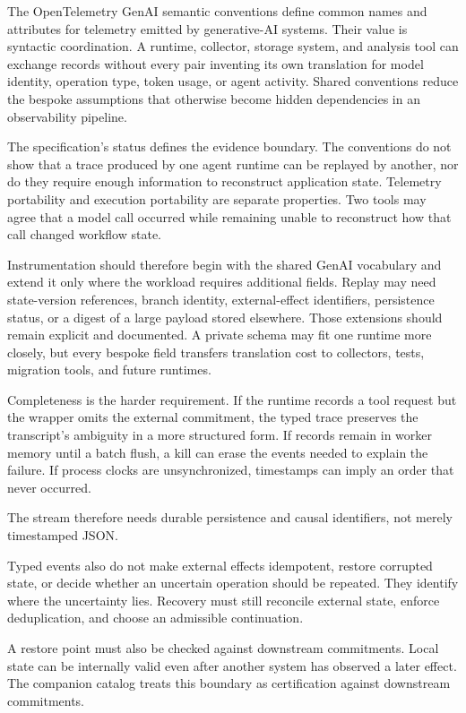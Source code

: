 The OpenTelemetry GenAI semantic conventions define common names and attributes for telemetry emitted by generative-AI systems. Their value is syntactic coordination. A runtime, collector, storage system, and analysis tool can exchange records without every pair inventing its own translation for model identity, operation type, token usage, or agent activity. Shared conventions reduce the bespoke assumptions that otherwise become hidden dependencies in an observability pipeline.

The specification's status defines the evidence boundary. The conventions do not show that a trace produced by one agent runtime can be replayed by another, nor do they require enough information to reconstruct application state. Telemetry portability and execution portability are separate properties. Two tools may agree that a model call occurred while remaining unable to reconstruct how that call changed workflow state.

Instrumentation should therefore begin with the shared GenAI vocabulary and extend it only where the workload requires additional fields. Replay may need state-version references, branch identity, external-effect identifiers, persistence status, or a digest of a large payload stored elsewhere. Those extensions should remain explicit and documented. A private schema may fit one runtime more closely, but every bespoke field transfers translation cost to collectors, tests, migration tools, and future runtimes.

Completeness is the harder requirement. If the runtime records a tool request but the wrapper omits the external commitment, the typed trace preserves the transcript's ambiguity in a more structured form. If records remain in worker memory until a batch flush, a kill can erase the events needed to explain the failure. If process clocks are unsynchronized, timestamps can imply an order that never occurred.

The stream therefore needs durable persistence and causal identifiers, not merely timestamped JSON.

Typed events also do not make external effects idempotent, restore corrupted state, or decide whether an uncertain operation should be repeated. They identify where the uncertainty lies. Recovery must still reconcile external state, enforce deduplication, and choose an admissible continuation.

A restore point must also be checked against downstream commitments. Local state can be internally valid even after another system has observed a later effect. The companion catalog treats this boundary as certification against downstream commitments.

